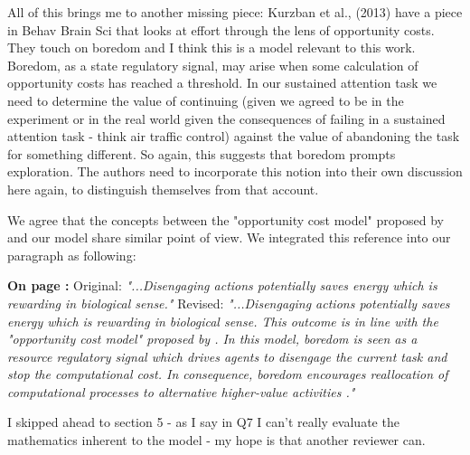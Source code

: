 \documentclass[utf8]{article}
\newenvironment{reply}  
    {\color{Blue}\noindent\newline}
    {\newline}
\newcommand{\revise}[3]{
    \noindent
    \newline
    \textbf{On page {#1}:}\newline
    \newline
    Original:\newline
    \textit{"#2"}
    \newline
    \newline
    Revised:\newline
    \textit{"#3"}\newline}
\begin{document}
        All of this brings me to another missing piece: Kurzban  et al., (2013) have a piece in Behav Brain Sci that looks at effort through the lens of opportunity costs. They touch on boredom and I think this is a model relevant to this work. Boredom, as a state regulatory signal, may arise when some calculation of opportunity costs has reached a threshold. In our sustained attention task we need to determine the value of continuing (given we agreed to be in the experiment or in the real world given the consequences of failing in a sustained attention task - think air traffic control) against the value of abandoning the task for something different. So again, this suggests that boredom prompts exploration. The authors need to incorporate this notion into their own discussion here again, to distinguish themselves from that account.  
        
        
        \begin{reply}
            We agree that the concepts between the "opportunity cost model" proposed by \cite{Kurzban2013} and our model share similar point of view. We integrated this reference into our paragraph as following:
        
            \revise{\pageref{rev:energyPOV}}
                {...Disengaging actions potentially saves energy which is rewarding in biological sense.}
                {...Disengaging actions potentially saves energy which is rewarding in biological sense. \label{rev:energyPOV} This outcome is in line with the "opportunity cost model" proposed by \cite{Kurzban2013}. In this model, boredom is seen as a resource regulatory signal which drives agents to disengage the current task and stop the computational cost. In consequence, boredom encourages reallocation of computational processes to alternative higher-value activities \citep{Kurzban2013}.}
            
        \end{reply}
        
        
        
        I skipped ahead to section 5 - as I say in Q7 I can't really evaluate the mathematics inherent to the model - my hope is that another reviewer can.
        
\end{document}
